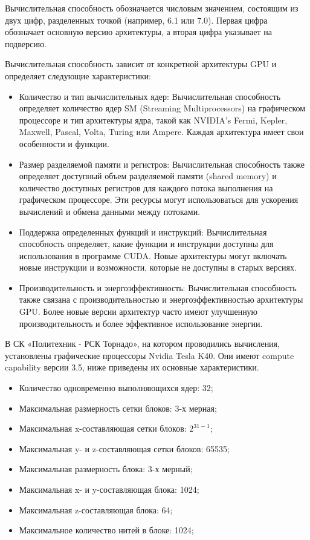 \documentclass[a4paper, final]{article}
\begin{document}
    Вычислительная способность обозначается числовым значением, состоящим из двух цифр, разделенных точкой (например, 6.1 или 7.0). Первая цифра обозначает основную версию архитектуры, а вторая цифра указывает на подверсию.
    
    Вычислительная способность зависит от конкретной архитектуры GPU и определяет следующие характеристики:
    \begin{itemize}
        \item Количество и тип вычислительных ядер: Вычислительная способность определяет количество ядер SM (Streaming Multiprocessors) на графическом процессоре и тип архитектуры ядра, такой как NVIDIA's Fermi, Kepler, Maxwell, Pascal, Volta, Turing или Ampere. Каждая архитектура имеет свои особенности и функции.
        \item Размер разделяемой памяти и регистров: Вычислительная способность также определяет доступный объем разделяемой памяти (shared memory) и количество доступных регистров для каждого потока выполнения на графическом процессоре. Эти ресурсы могут использоваться для ускорения вычислений и обмена данными между потоками.
        \item Поддержка определенных функций и инструкций: Вычислительная способность определяет, какие функции и инструкции доступны для использования в программе CUDA. Новые архитектуры могут включать новые инструкции и возможности, которые не доступны в старых версиях.
        \item Производительность и энергоэффективность: Вычислительная способность также связана с производительностью и энергоэффективностью архитектуры GPU. Более новые версии архитектур часто имеют улучшенную производительность и более эффективное использование энергии.
    \end{itemize}
    
    В СК «Политехник - РСК Торнадо», на котором проводились вычисления, установлены графические процессоры Nvidia Tesla K40. Они имеют compute capability версии 3.5, ниже приведены их основные характеристики.
    \begin{itemize}
    \item Количество одновременно выполняющихся ядер: 32;
    \item Максимальная размерность сетки блоков: 3-х мерная;
    \item Максимальная x-составляющая сетки блоков: $2^{31 - 1}$;
    \item Максимальная y- и z-составляющая сетки блоков: 65535;
    \item Максимальная размерность блока: 3-х мерный;
    \item Максимальная x- и y-составляющая блока: 1024;
    \item Максимальная z-составляющая блока: 64;
    \item Максимальное количество нитей в блоке: 1024;
   \end{itemize}
\end{document}
